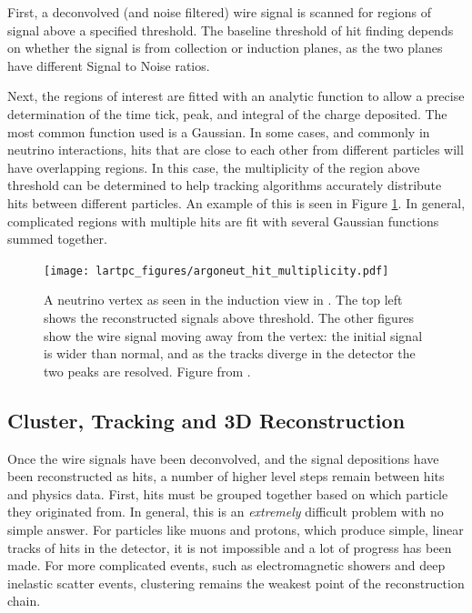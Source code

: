 First, a deconvolved (and noise filtered) wire signal is scanned for regions of signal above a specified threshold.  The baseline threshold of hit finding depends on whether the signal is from collection or induction planes, as the two planes have different Signal to Noise ratios.

Next, the regions of interest are fitted with an analytic function to allow a precise determination of the time tick, peak, and integral of the charge deposited.  The most common function used is a Gaussian.  In some cases, and commonly in neutrino interactions, hits that are close to each other from different particles will have overlapping regions.  In this case, the multiplicity of the region above threshold can be determined to help tracking algorithms accurately distribute hits between different particles.  An example of this is seen in Figure \ref{fig:argoneut_hit_multiplicity}.  In general, complicated regions with multiple hits are fit with several Gaussian functions summed together.

\begin{figure}[htbp]
  \centering
  \texttt{[image: lartpc\_figures/argoneut\_hit\_multiplicity.pdf]}
  \caption[Hit Finding in \argoneut]{A neutrino vertex as seen in the induction view in \argoneut.  The top left shows the reconstructed signals above threshold.  The other figures show the wire signal moving away from the vertex: the initial signal is wider than normal, and as the tracks diverge in the detector the two peaks are resolved.  Figure from \cite{Anderson:2012vc}.}
  \label{fig:argoneut_hit_multiplicity}
\end{figure}

\subsection{Cluster, Tracking and 3D Reconstruction}

Once the wire signals have been deconvolved, and the signal depositions have been reconstructed as hits, a number of higher level steps remain between hits and physics data.  First, hits must be grouped together based on which particle they originated from.  In general, this is an {\em extremely} difficult problem with no simple answer.  For particles like muons and protons, which produce simple, linear tracks of hits in the detector, it is not impossible and a lot of progress has been made.  For more complicated events, such as electromagnetic showers and deep inelastic scatter events, clustering remains the weakest point of the reconstruction chain.

